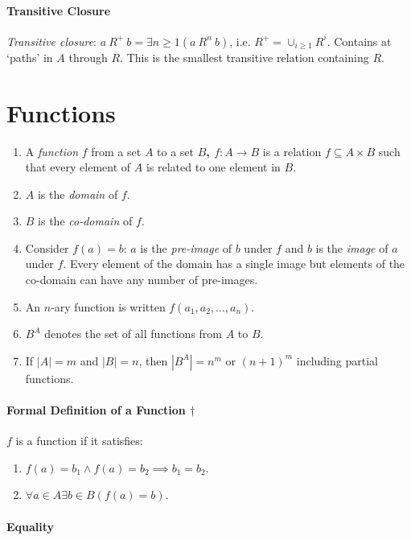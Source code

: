 \documentclass[10pt,twoside,twocolumn]{article}
\begin{document}
\paragraph{Transitive Closure}

\emph{Transitive closure}: $a\:R^{+}\:b=\exists n\geq1\left(a\:R^{n}\:b\right)$,
i.e. $R^{+}=\cup_{i\geq1}R^{i}$. Contains at `paths' in $A$ through
$R$. This is the smallest transitive relation containing $R$.


\section{Functions}
\begin{enumerate}
\item A \emph{function} $f$ from a set $A$ to a set \textbf{$B$, $f:A\rightarrow B$}
is a relation $f\subseteq A\times B$ such that every element of $A$
is related to one element in $B$.
\item $A$ is the \emph{domain} of $f$.
\item $B$ is the \emph{co-domain} of $f$.
\item Consider $f\left(a\right)=b$: $a$ is the \emph{pre-image} of $b$
under $f$ and $b$ is the \emph{image} of $a$ under $f$. Every
element of the domain has a single image but elements of the co-domain
can have any number of pre-images.
\item An $n$-ary function is written $f\left(a_{1},a_{2},\dots,a_{n}\right)$.
\item $B^{A}$ denotes the set of all functions from $A$ to \textbf{$B$}.
\item If $\left|A\right|=m$ and $\left|B\right|=n$, then $\left|B^{A}\right|=n^{m}$ or $\left(n+1\right)^{m}$ including partial functions.
\end{enumerate}

\paragraph{Formal Definition of a Function $\boldsymbol{\dagger}$}

$f$ is a function if it satisfies:
\begin{enumerate}
\item $f\left(a\right)=b_{1}\land f\left(a\right)=b_{2}\implies b_{1}=b_{2}$.
\item $\forall a\in A\exists b\in B\left(f\left(a\right)=b\right)$.
\end{enumerate}

\paragraph{Equality}
\end{document}
